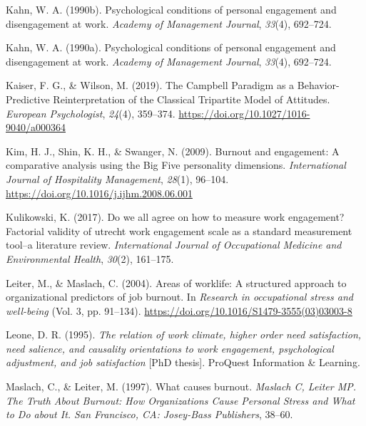 \documentclass[
  man]{apa7}
\newlength{\cslhangindent}
\newlength{\cslentryspacingunit} %
\newenvironment{CSLReferences}[2] %
 {%
  \setlength{\parindent}{0pt}
  \ifodd #1
  \let\oldpar\par
  \def\par{\hangindent=\cslhangindent\oldpar}
  \fi
  \setlength{\parskip}{#2\cslentryspacingunit}
 }%
 {}
\begin{document}
\begin{CSLReferences}{1}{0}
\leavevmode{}%
Kahn, W. A. (1990b). Psychological conditions of personal engagement and disengagement at work. \emph{Academy of Management Journal}, \emph{33}(4), 692--724.

\leavevmode{}%
Kahn, W. A. (1990a). Psychological conditions of personal engagement and disengagement at work. \emph{Academy of Management Journal}, \emph{33}(4), 692--724.

\leavevmode{}%
Kaiser, F. G., \& Wilson, M. (2019). The {Campbell} {Paradigm} as a {Behavior}-{Predictive} {Reinterpretation} of the {Classical} {Tripartite} {Model} of {Attitudes}. \emph{European Psychologist}, \emph{24}(4), 359--374. \url{https://doi.org/10.1027/1016-9040/a000364}

\leavevmode{}%
Kim, H. J., Shin, K. H., \& Swanger, N. (2009). Burnout and engagement: {A} comparative analysis using the {Big} {Five} personality dimensions. \emph{International Journal of Hospitality Management}, \emph{28}(1), 96--104. \url{https://doi.org/10.1016/j.ijhm.2008.06.001}

\leavevmode{}%
Kulikowski, K. (2017). Do we all agree on how to measure work engagement? Factorial validity of utrecht work engagement scale as a standard measurement tool--a literature review. \emph{International Journal of Occupational Medicine and Environmental Health}, \emph{30}(2), 161--175.

\leavevmode{}%
Leiter, M., \& Maslach, C. (2004). Areas of worklife: A structured approach to organizational predictors of job burnout. In \emph{Research in occupational stress and well-being} (Vol. 3, pp. 91--134). \url{https://doi.org/10.1016/S1479-3555(03)03003-8}

\leavevmode{}%
Leone, D. R. (1995). \emph{The relation of work climate, higher order need satisfaction, need salience, and causality orientations to work engagement, psychological adjustment, and job satisfaction} {[}PhD thesis{]}. ProQuest Information \& Learning.

\leavevmode{}%
Maslach, C., \& Leiter, M. (1997). What causes burnout. \emph{Maslach C, Leiter MP. The Truth About Burnout: How Organizations Cause Personal Stress and What to Do about It. San Francisco, CA: Josey-Bass Publishers}, 38--60.


\end{CSLReferences}
\end{document}
